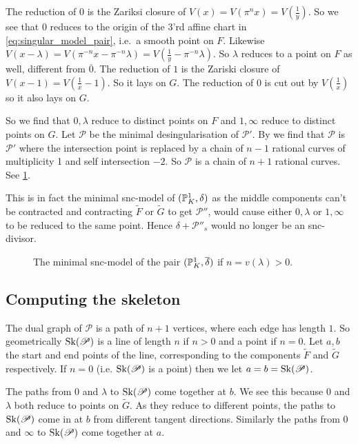 The reduction of $0$ is the Zariksi closure of $V(x) = V(\pi ^{n} x ) = V(\frac{1}{y})$. 
So we see that $0$ reduces to the origin of the 3'rd affine chart in \eqref{eq:singular_model_pair}, i.e.\ a smooth point on $F$. 
Likewise  $V(x - \lambda) = V(\pi^{-n} x - \pi^{-n}\lambda) = V(\frac{1}{y} - \pi^{-n}\lambda)$. 
So $\lambda$ reduces to a point on $F$ as well, different from $\overline{0}$.
The reduction of $1$ is the Zariski closure of $V(x-1) = V(\frac{1}{x} - 1)$. 
So it lays on $G$. The reduction of $0$ is cut out by $V(\frac{1}{x})$ so it also lays on $G$. 

So we find that $0, \lambda$ reduce to distinct points on $F$ and $1, \infty$ reduce to distinct points on $G$. 
Let $\mathscr P$ be the minimal desingularisation of $\mathscr P'$. 
By \cite[cor.\ 9.3.25]{liuAlgebraicGeometryArithmetic2002} we find that $\mathscr P$ is $\mathscr P'$ where the intersection point is replaced by a chain of $n-1$ rational curves of multiplicity 1 and self intersection $-2$.  
So $\mathscr P$ is a chain of $n + 1$ rational curves. See \cref{fig:model_of_the_pair}. 

This is in fact the minimal snc-model of $(\mathbb{P}^{1}_K, \delta)$ as the middle components can't be contracted and contracting $\tilde F$ or $\tilde G$ to get $\mathscr P''$, would cause either $0, \lambda$ or $1, \infty$ to be reduced to the same point. Hence $\delta + \mathscr P''_s$ would no longer be an snc-divisor. 
\begin{figure}[h]
    \centering
    \caption{The minimal snc-model of the pair $(\mathbb{P}^{1}_K, \overline{\delta})$ if $n =v(\lambda) > 0$. }
    \label{fig:model_of_the_pair}
\end{figure}

\subsection{Computing the skeleton} \label{sec:computing_the_skeleton}

The dual graph of $\mathscr P$ is a path of $n + 1$ vertices, where each edge has length $1$. 
So geometrically $\operatorname{Sk}(\mathscr P)$ is a line of length $n$ if $n > 0$ and a point if $n = 0$.
Let $a, b$ the start and end points of the line, corresponding to the components $\tilde F$ and $\tilde G$ respectively. If $n = 0$ (i.e. $\operatorname{Sk}(\mathscr P)$ is a point) then we let $a = b = \operatorname{Sk}(\mathscr P)$. 

The paths from $0$ and  $\lambda$ to $\operatorname{Sk}(\mathscr P)$ come together at $b$. We see this because $0$ and $\lambda$ both reduce to points on $\tilde G$. 
As they reduce to different points, the paths to $\operatorname{Sk}(\mathscr P)$ come in at $b$ from different tangent directions. 
Similarly the paths from $0$ and $\infty$ to $\operatorname{Sk}(\mathscr P)$ come together at $a$.


